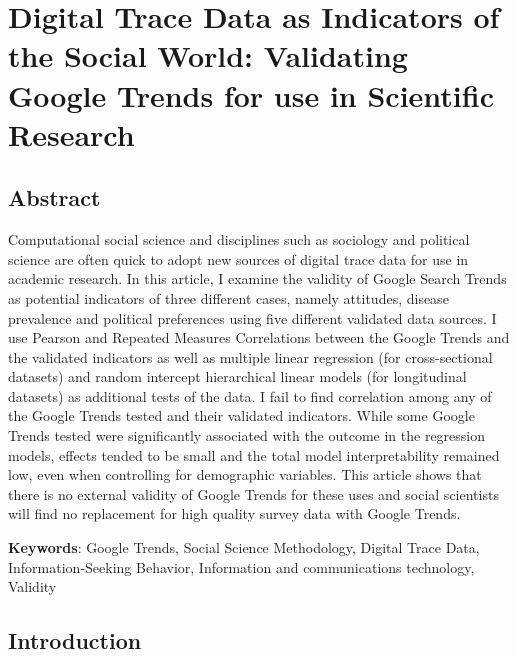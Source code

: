 \hypertarget{paper-1}{%
\chapter{Digital Trace Data as Indicators of the Social World: Validating Google Trends for use in Scientific Research}\label{paper-1}}

\section{Abstract}

Computational social science and disciplines such as sociology and
political science are often quick to adopt new sources of digital 
trace data for use in academic research. 
In this article, I examine the validity of Google Search Trends 
as potential indicators of three different cases, namely attitudes, 
disease prevalence and political preferences using five
different validated data sources. I use Pearson and Repeated Measures Correlations 
between the Google Trends and the validated indicators as well as multiple linear regression
(for cross-sectional datasets) and random intercept hierarchical linear models
(for longitudinal datasets) as additional tests of the data. 
I fail to find correlation among any of the Google 
Trends tested and their validated indicators. While some Google Trends 
tested were significantly associated with the outcome in the regression models,
effects tended to be small and the total model interpretability remained low,
even when controlling for demographic variables. This article shows that there is no 
external validity of Google Trends for these uses and social scientists
will find no replacement for high quality survey data with Google Trends. 

\textbf{Keywords}: Google Trends, Social Science Methodology, Digital Trace Data, Information-Seeking Behavior, Information and communications technology, Validity

\section{Introduction}


